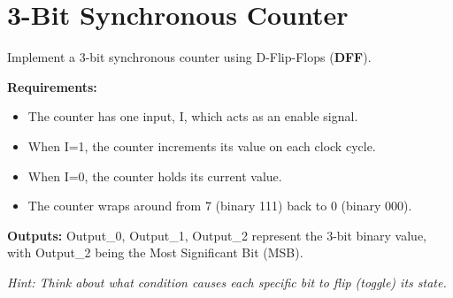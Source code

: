 \section*{3-Bit Synchronous Counter}
Implement a 3-bit synchronous counter using D-Flip-Flops (\textbf{DFF}).

\textbf{Requirements:}
\begin{itemize}
\item The counter has one input, I, which acts as an enable signal.
\item When I=1, the counter increments its value on each clock cycle.
\item When I=0, the counter holds its current value.
\item The counter wraps around from 7 (binary 111) back to 0 (binary 000).
\end{itemize}

\textbf{Outputs:}
Output_0, Output_1, Output_2 represent the 3-bit binary value, with Output_2 being the Most Significant Bit (MSB).

\textit{Hint: Think about what condition causes each specific bit to flip (toggle) its state.}